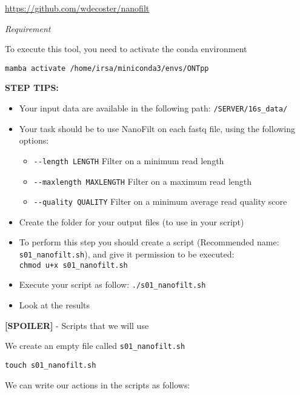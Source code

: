 \documentclass[
]{book}
\newenvironment{Shaded}{\begin{snugshade}}{\end{snugshade}}
\newcommand{\AttributeTok}[1]{\textcolor[rgb]{0.13,0.29,0.53}{#1}}
\newcommand{\BuiltInTok}[1]{#1}
\newcommand{\CommentTok}[1]{\textcolor[rgb]{0.56,0.35,0.01}{\textit{#1}}}
\newcommand{\ControlFlowTok}[1]{\textcolor[rgb]{0.13,0.29,0.53}{\textbf{#1}}}
\newcommand{\ExtensionTok}[1]{#1}
\newcommand{\FunctionTok}[1]{\textcolor[rgb]{0.13,0.29,0.53}{\textbf{#1}}}
\newcommand{\KeywordTok}[1]{\textcolor[rgb]{0.13,0.29,0.53}{\textbf{#1}}}
\newcommand{\NormalTok}[1]{#1}
\newcommand{\OperatorTok}[1]{\textcolor[rgb]{0.81,0.36,0.00}{\textbf{#1}}}
\newcommand{\PreprocessorTok}[1]{\textcolor[rgb]{0.56,0.35,0.01}{\textit{#1}}}
\newcommand{\StringTok}[1]{\textcolor[rgb]{0.31,0.60,0.02}{#1}}
\newcommand{\VariableTok}[1]{\textcolor[rgb]{0.00,0.00,0.00}{#1}}
\providecommand{\tightlist}{%
  \setlength{\itemsep}{0pt}\setlength{\parskip}{0pt}}
\begin{document}
\url{https://github.com/wdecoster/nanofilt}

\emph{Requirement}

To execute this tool, you need to activate the conda environment

\texttt{mamba\ activate\ /home/irsa/miniconda3/envs/ONTpp}

\textbf{STEP TIPS:}

\begin{itemize}
\tightlist
\item
  Your input data are available in the following path: \texttt{/SERVER/16s\_data/}
\item
  Your task should be to use NanoFilt on each fastq file, using the following options:

  \begin{itemize}
  \tightlist
  \item
    \texttt{-\/-length\ LENGTH} Filter on a minimum read length
  \item
    \texttt{-\/-maxlength\ MAXLENGTH} Filter on a maximum read length
  \item
    \texttt{-\/-quality\ QUALITY} Filter on a minimum average read quality score
  \end{itemize}
\item
  Create the folder for your output files (to use in your script)
\item
  To perform this step you should create a script (Recommended name: \texttt{s01\_nanofilt.sh}), and give it permission to be executed: \texttt{chmod\ u+x\ s01\_nanofilt.sh}
\item
  Execute your script as follow: \texttt{./s01\_nanofilt.sh}
\item
  Look at the results
\end{itemize}

\textbf{{[}SPOILER{]}} - Scripts that we will use

We create an empty file called \texttt{s01\_nanofilt.sh}

\texttt{touch\ s01\_nanofilt.sh}

We can write our actions in the scripts as follows:

\begin{Shaded}
\end{Shaded}
\end{document}
